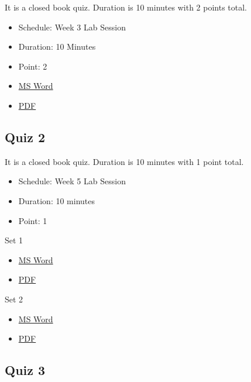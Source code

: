 It is a closed book quiz. Duration is 10 minutes with 2 points total.

\begin{itemize}

\item
  Schedule: Week 3 Lab Session
\item
  Duration: 10 Minutes
\item
  Point: 2
\item
  \href{https://drive.google.com/open?id=0B88HKpainTSfTXJBU0RuYkV5c2s}{MS
  Word}
\item
  \href{https://drive.google.com/open?id=0B88HKpainTSfTDNrNjJIZ3VvQUE}{PDF}
\end{itemize}

\subsection{Quiz 2}\label{quiz-2}

It is a closed book quiz. Duration is 10 minutes with 1 point total.

\begin{itemize}

\item
  Schedule: Week 5 Lab Session
\item
  Duration: 10 minutes
\item
  Point: 1
\end{itemize}

Set 1

\begin{itemize}

\item
  \href{https://drive.google.com/open?id=0B88HKpainTSfRUNCdnVxLXY2Tjg}{MS
  Word}
\item
  \href{https://drive.google.com/open?id=0B88HKpainTSfekJpWTJBZ0J4RFU}{PDF}
\end{itemize}

Set 2

\begin{itemize}

\item
  \href{https://drive.google.com/open?id=0B88HKpainTSfeWpUQUJsTUdFSVE}{MS
  Word}
\item
  \href{https://drive.google.com/open?id=0B88HKpainTSfMjRLTHdmSjJVelE}{PDF}
\end{itemize}

\subsection{Quiz 3}\label{quiz-3}

